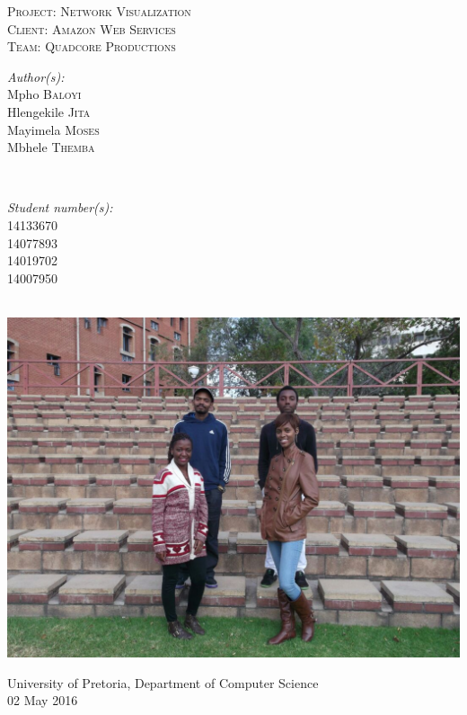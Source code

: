 \documentclass[a4paper,12pt]{article}
\begin{document}
\begin{titlepage}
\center

\textsc{\LARGE Project: Network Visualization}\\[1.5cm]
\textsc{\Large Client: Amazon Web Services}\\[0.5cm]
\textsc{\large Team: Quadcore Productions}\\[0.5cm]

\begin{minipage}{0.4\textwidth}
\begin{flushleft} \large
\emph{Author(s):}\\
Mpho \textsc{Baloyi}\\
Hlengekile \textsc{Jita}\\
Mayimela \textsc{Moses}\\
Mbhele \textsc{Themba}\\
\end{flushleft}
\end{minipage}
~
\begin{minipage}{0.4\textwidth}
\begin{flushright} \large
\emph{Student number(s):} \\
14133670\\ %
14077893\\
14019702\\
14007950\\
\end{flushright}
\end{minipage}\\

\includegraphics[width=\textwidth]{images/GroupPhoto}

{\large University of Pretoria, Department of Computer Science}\\

{\large 02 May 2016}\\[3cm]

\vfil

\end{titlepage}
\newpage
\tableofcontents
\newpage
\end{document}
